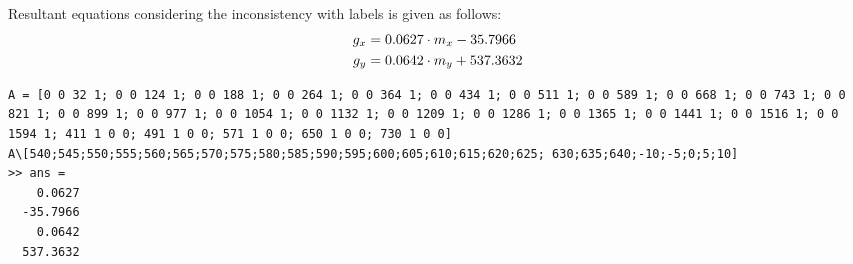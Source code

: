 \documentclass[a4paper]{article}
\begin{document}
Resultant equations considering the inconsistency with labels is given as follows:
\begin{equation}{\label{eq:conversionbetter}}
	\begin{aligned}
		g_x &=  0.0627 \cdot m_x - 35.7966\\
		g_y &=  0.0642 \cdot m_y + 537.3632
	\end{aligned}
\end{equation}{\label{eq:conversion}}
\begin{verbatim}
A = [0 0 32 1; 0 0 124 1; 0 0 188 1; 0 0 264 1; 0 0 364 1; 0 0 434 1; 0 0 511 1; 0 0 589 1; 0 0 668 1; 0 0 743 1; 0 0 821 1; 0 0 899 1; 0 0 977 1; 0 0 1054 1; 0 0 1132 1; 0 0 1209 1; 0 0 1286 1; 0 0 1365 1; 0 0 1441 1; 0 0 1516 1; 0 0 1594 1; 411 1 0 0; 491 1 0 0; 571 1 0 0; 650 1 0 0; 730 1 0 0]
A\[540;545;550;555;560;565;570;575;580;585;590;595;600;605;610;615;620;625; 630;635;640;-10;-5;0;5;10]
>> ans =
    0.0627
  -35.7966
    0.0642
  537.3632
\end{verbatim}
\end{document}
